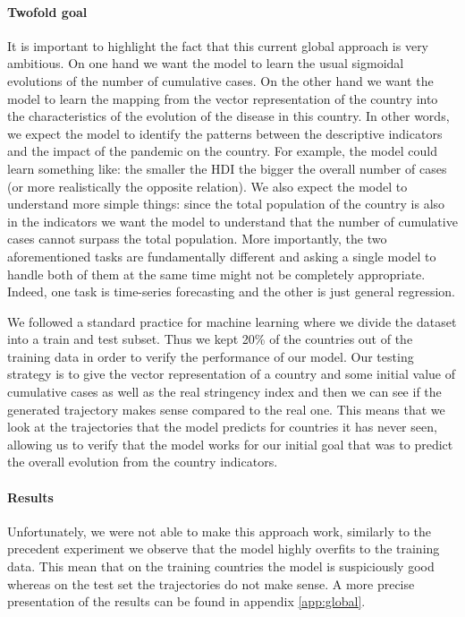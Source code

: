 \documentclass[12pt, letterpaper]{article}
\begin{document}
\paragraph{Twofold goal} 
It is important to highlight the fact that this current global approach is very ambitious.
On one hand we want the model to learn the usual sigmoidal evolutions of the number of cumulative cases.
On the other hand we want the model to learn the mapping from the vector representation of the country into the characteristics of the evolution of the disease in this country. 
In other words, we expect the model to identify the patterns between the descriptive indicators and the impact of the pandemic on the country.
For example, the model could learn something like: the smaller the HDI the bigger the overall number of cases (or more realistically the opposite relation). 
We also expect the model to understand more simple things: since the total population of the country is also in the indicators we want the model to understand that the number of cumulative cases cannot surpass the total population. 
More importantly, the two aforementioned tasks are fundamentally different and asking a single model to handle both of them at the same time might not be completely appropriate.
Indeed, one task is time-series forecasting and the other is just general regression.


We followed a standard practice for machine learning where we divide the dataset into a train and test subset. 
Thus we kept 20\% of the countries out of the training data in order to verify the performance of our model.
Our testing strategy is to give the vector representation of a country and some initial value of cumulative cases as well as the real stringency index and then we can see if the generated trajectory makes sense compared to the real one.
This means that we look at the trajectories that the model predicts for countries it has never seen, allowing us to verify that the model works for our initial goal that was to predict the overall evolution from the country indicators.

\paragraph{Results} 
Unfortunately, we were not able to make this approach work, similarly to the precedent experiment we observe that the model highly overfits to the training data.
This mean that on the training countries the model is suspiciously good whereas on the test set the trajectories do not make sense. 
A more precise presentation of the results can be found in appendix \ref{app:global}.
\end{document}
